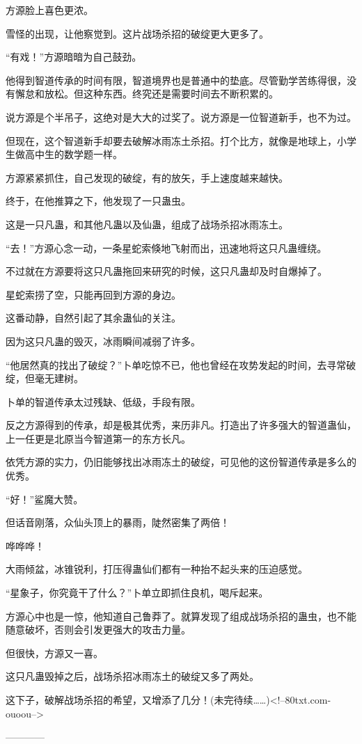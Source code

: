 \begin{this_body}
方源脸上喜色更浓。

雪怪的出现，让他察觉到。这片战场杀招的破绽更大更多了。

“有戏！”方源暗暗为自己鼓劲。

他得到智道传承的时间有限，智道境界也是普通中的垫底。尽管勤学苦练得很，没有懈怠和放松。但这种东西。终究还是需要时间去不断积累的。

说方源是个半吊子，这绝对是大大的过奖了。说方源是一位智道新手，也不为过。

但现在，这个智道新手却要去破解冰雨冻土杀招。打个比方，就像是地球上，小学生做高中生的数学题一样。

方源紧紧抓住，自己发现的破绽，有的放矢，手上速度越来越快。

终于，在他推算之下，他发现了一只蛊虫。

这是一只凡蛊，和其他凡蛊以及仙蛊，组成了战场杀招冰雨冻土。

“去！”方源心念一动，一条星蛇索倏地飞射而出，迅速地将这只凡蛊缠绕。

不过就在方源要将这只凡蛊拖回来研究的时候，这只凡蛊却及时自爆掉了。

星蛇索捞了空，只能再回到方源的身边。

这番动静，自然引起了其余蛊仙的关注。

因为这只凡蛊的毁灭，冰雨瞬间减弱了许多。

“他居然真的找出了破绽？”卜单吃惊不已，他也曾经在攻势发起的时间，去寻常破绽，但毫无建树。

卜单的智道传承太过残缺、低级，手段有限。

反之方源得到的传承，却是极其优秀，来历非凡。打造出了许多强大的智道蛊仙，上一任更是北原当今智道第一的东方长凡。

依凭方源的实力，仍旧能够找出冰雨冻土的破绽，可见他的这份智道传承是多么的优秀。

“好！”鲨魔大赞。

但话音刚落，众仙头顶上的暴雨，陡然密集了两倍！

哗哗哗！

大雨倾盆，冰锥锐利，打压得蛊仙们都有一种抬不起头来的压迫感觉。

“星象子，你究竟干了什么？”卜单立即抓住良机，喝斥起来。

方源心中也是一惊，他知道自己鲁莽了。就算发现了组成战场杀招的蛊虫，也不能随意破坏，否则会引发更强大的攻击力量。

但很快，方源又一喜。

这只凡蛊毁掉之后，战场杀招冰雨冻土的破绽又多了两处。

这下子，破解战场杀招的希望，又增添了几分！(未完待续……)<!--80txt.com-ouoou-->

------------

\end{this_body}

